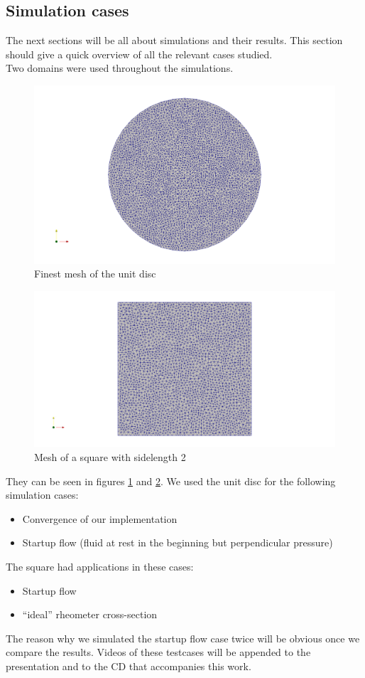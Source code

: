 \documentclass[12pt,a4paper,twoside, open=right]{scrreprt}
\theoremstyle{definition}
\theoremstyle{plain}
\begin{document}
\subsection{Simulation cases}
The next sections will be all about simulations and their results. This section should give a quick overview of all the relevant cases studied. \\
Two domains were used throughout the simulations. 
\begin{figure}
    \includegraphics[width=\textwidth]{meshcircle}
    \caption{Finest mesh of the unit disc}
    \label{fig:mesh}
\end{figure}
\begin{figure}
    \includegraphics[width=\textwidth]{meshsquare}
    \caption{Mesh of a square with sidelength 2}
    \label{fig:meshsquare}
\end{figure}
They can be seen in figures \ref{fig:mesh} and \ref{fig:meshsquare}.
We used the unit disc for the following simulation cases:
\begin{itemize}
    \item Convergence of our implementation
    \item Startup flow (fluid at rest in the beginning but perpendicular pressure)
\end{itemize}
The square had applications in these cases:
\begin{itemize}
    \item Startup flow
    \item \enquote{ideal} rheometer cross-section
\end{itemize}
The reason why we simulated the startup flow case twice will be obvious once we compare the results. Videos of these testcases will be appended to the presentation and to the CD that accompanies this work.
\end{document}
